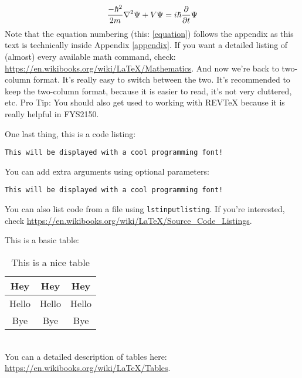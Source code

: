 \documentclass[reprint,english,notitlepage]{revtex4-2}
\begin{document}
\begin{equation}\label{equation}
\frac{-\hbar^2}{2m}\laplacian{\Psi}+V\Psi=i\hbar\pdv{t}\Psi
\end{equation}
Note that the equation numbering (this: \ref{equation}) follows the appendix as this text is technically inside Appendix \ref{appendix}. If you want a detailed listing of (almost) every available math command, check: \url{https://en.wikibooks.org/wiki/LaTeX/Mathematics}.
\vspace{1cm} %
\twocolumngrid
And now we're back to two-column format. It's really easy to switch between the two. It's recommended to keep the two-column format, because it is easier to read, it's not very cluttered, etc. Pro Tip: You should also get used to working with REVTeX because it is really helpful in FYS2150.

One last thing, this is a code listing:
\begin{lstlisting}
This will be displayed with a cool programming font!
\end{lstlisting}
You can add extra arguments using optional parameters:
\begin{lstlisting}[morekeywords={cool}]
This will be displayed with a cool programming font!
\end{lstlisting}
You can also list code from a file using \texttt{lstinputlisting}. If you're interested, check \url{https://en.wikibooks.org/wiki/LaTeX/Source_Code_Listings}.

This is a basic table:
\begin{table}[h]  %
\caption{This is a nice table}\label{table}
\begin{tabular}{|c|c|c|} %
\hline                    %
Hey & Hey & Hey  \\
\hline
Hello & Hello & Hello \\
\hline
Bye & Bye & Bye \\
\hline
\end{tabular}
\end{table}\\
You can a detailed description of tables here: \url{https://en.wikibooks.org/wiki/LaTeX/Tables}.
\end{document}
